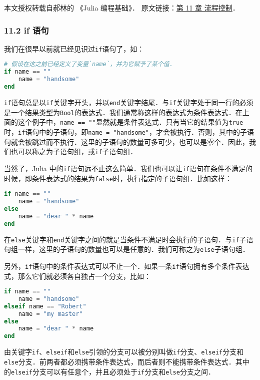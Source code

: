 
本文授权转载自郝林的 《Julia 编程基础》． 原文链接：\href{https://github.com/hyper0x/JuliaBasics/blob/master/book/ch11.md}{第 11 章 流程控制}．

\subsubsection{11.2 if 语句}

我们在很早以前就已经见识过\verb|if|语句了，如：

\begin{lstlisting}[language=julia]
# 假设在这之前已经定义了变量`name`，并为它赋予了某个值．
if name == "" 
    name = "handsome" 
end
\end{lstlisting}

\verb|if|语句总是以\verb|if|关键字开头，并以\verb|end|关键字结尾．与\verb|if|关键字处于同一行的必须是一个结果类型为\verb|Bool|的表达式．我们通常称这样的表达式为条件表达式．在上面的这个例子中，\verb|name == ""|显然就是条件表达式．只有当它的结果值为\verb|true|时，\verb|if|语句中的子语句，即\verb|name = "handsome"|，才会被执行．否则，其中的子语句就会被跳过而不执行．这里的子语句的数量可多可少，也可以是零个．因此，我们也可以称之为子语句组，或\verb|if|子语句组．

当然了，Julia 中的\verb|if|语句远不止这么简单．我们也可以让\verb|if|语句在条件不满足的时候，即条件表达式的结果为\verb|false|时，执行指定的子语句组．比如这样：

\begin{lstlisting}[language=julia]
if name == "" 
    name = "handsome" 
else 
    name = "dear " * name
end
\end{lstlisting}

在\verb|else|关键字和\verb|end|关键字之间的就是当条件不满足时会执行的子语句．与\verb|if|子语句组一样，这里的子语句的数量也可以是任意的．我们可称之为\verb|else|子语句组．

另外，\verb|if|语句中的条件表达式可以不止一个．如果一条\verb|if|语句拥有多个条件表达式，那么它们就必须各自独占一个分支，比如：

\begin{lstlisting}[language=julia]
if name == ""
    name = "handsome"
elseif name == "Robert"
    name = "my master"
else
    name = "dear " * name
end
\end{lstlisting}

由关键字\verb|if|、\verb|elseif|和\verb|else|引领的分支可以被分别叫做\verb|if|分支、\verb|elseif|分支和\verb|else|分支．前两者都必须携带条件表达式，而后者则不能携带条件表达式．其中的\verb|elseif|分支可以有任意个，并且必须处于\verb|if|分支和\verb|else|分支之间．

